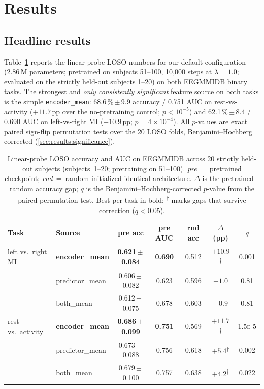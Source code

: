 \section{Results}
\label{sec:results}

\subsection{Headline results}
\label{sec:results:headline}

Table~\ref{tab:headline} reports the linear-probe LOSO numbers for our default configuration (2.86\,M parameters; pretrained on subjects 51--100, 10{,}000 steps at $\lambda{=}1.0$; evaluated on the strictly held-out subjects 1--20) on both EEGMMIDB binary tasks. The strongest and \emph{only consistently significant} feature source on both tasks is the simple \texttt{encoder\_mean}: 68.6\,\%\,$\pm$\,9.9 accuracy / 0.751 AUC on rest-vs-activity ($+11.7$\,pp over the no-pretraining control; $p{<}10^{-5}$) and 62.1\,\%\,$\pm$\,8.4 / 0.690 AUC on left-vs-right MI ($+10.9$\,pp; $p{=}4{\times}10^{-4}$). All $p$-values are exact paired sign-flip permutation tests over the 20 LOSO folds, Benjamini--Hochberg corrected (\cref{sec:results:significance}).

\begin{table}[t]
\caption{Linear-probe LOSO accuracy and AUC on EEGMMIDB across 20 strictly held-out subjects (subjects~1--20; pretraining on 51--100). \emph{pre}~=~pretrained checkpoint; \emph{rnd}~=~random-initialized identical architecture. $\Delta$ is the pretrained$-$random accuracy gap; $q$ is the Benjamini--Hochberg-corrected $p$-value from the paired permutation test. Best per task in bold; \textsuperscript{$\dagger$} marks gaps that survive correction ($q<0.05$).}
\label{tab:headline}
\centering
\small
\begin{tabular}{l l c c c c c}
\toprule
Task & Source & pre acc & pre AUC & rnd acc & $\Delta$ (pp) & $q$ \\
\midrule
left vs.\ right MI & \textbf{encoder\_mean} & \textbf{0.621\,$\pm$\,0.084} & \textbf{0.690} & 0.512 & $\mathbf{+10.9}$\textsuperscript{$\dagger$} & 0.001 \\
& predictor\_mean & 0.606\,$\pm$\,0.082 & 0.623 & 0.596 & $+1.0$ & 0.81  \\
& both\_mean & 0.612\,$\pm$\,0.075 & 0.678 & 0.603 & $+0.9$ & 0.81  \\
\midrule
rest vs.\ activity  & \textbf{encoder\_mean} & \textbf{0.686\,$\pm$\,0.099} & \textbf{0.751} & 0.569 & $\mathbf{+11.7}$\textsuperscript{$\dagger$} & 1.5\textsc{e}-5 \\
& predictor\_mean & 0.673\,$\pm$\,0.088 & 0.756 & 0.618 & $+5.4$\textsuperscript{$\dagger$} & 0.002 \\
& both\_mean  & 0.679\,$\pm$\,0.100 & 0.757 & 0.638 & $+4.2$\textsuperscript{$\dagger$} & 0.022 \\
\bottomrule
\end{tabular}
\end{table}

